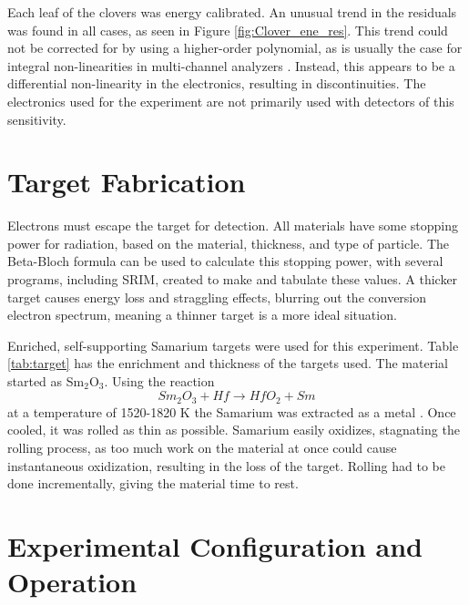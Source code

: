 

Each leaf of the clovers was energy calibrated. An unusual trend in the residuals was found in all cases, as seen in Figure \ref{fig:Clover_ene_res}. This trend could not be corrected for by using a higher-order polynomial, as is usually the case for integral non-linearities in multi-channel analyzers \citep{knoll00:rad_det_meas}. Instead, this appears to be a differential non-linearity in the electronics, resulting in discontinuities. The electronics used for the experiment are not primarily used with detectors of this sensitivity.



\section{Target Fabrication}

Electrons must escape the target for detection. All materials have some stopping power for radiation, based on the material, thickness, and type of particle. The Beta-Bloch formula can be used to calculate this stopping power, with several programs, including SRIM, created to make and tabulate these values\citep{ziegler10:_srim}. A thicker target causes energy loss and straggling effects, blurring out the conversion electron spectrum, meaning a thinner target is a more ideal situation.

Enriched, self-supporting Samarium targets were used for this experiment. Table \ref{tab:target} has the enrichment and thickness of the targets used. The material started as Sm$_2$O$_3$. Using the reaction
\begin{equation}
    Sm_2O_3 + Hf \xrightarrow{} HfO_2 + Sm
    \label{eq:sm_hf}
\end{equation}
at a temperature of 1520-1820 K the Samarium was extracted as a metal \citep{clifford02:_target}. Once cooled, it was rolled as thin as possible. Samarium easily oxidizes, stagnating the rolling process, as too much work on the material at once could cause instantaneous oxidization, resulting in the loss of the target. Rolling had to be done incrementally, giving the material time to rest.



\section{Experimental Configuration and Operation}

